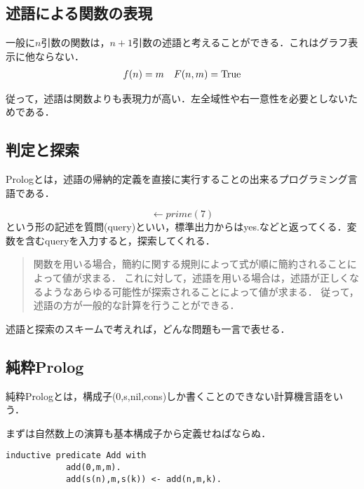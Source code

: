 \documentclass[uplatex, 12pt, dvipdfmx]{jsreport}
\begin{document}
\subsection{述語による関数の表現}

一般に$n$引数の関数は，$n+1$引数の述語と考えることができる．これはグラフ表示に他ならない．
\begin{align*}
    f(n) &= m & F(n,m)=\mathrm{True}
\end{align*}

従って，述語は関数よりも表現力が高い．左全域性や右一意性を必要としないためである．

\subsection{判定と探索}

Prologとは，述語の帰納的定義を直接に実行することの出来るプログラミング言語である．
\begin{definition}[query]
    \[\leftarrow prime(7)\]
    という形の記述を質問(query)といい，標準出力からはyes.などと返ってくる．変数を含むqueryを入力すると，探索してくれる．
\end{definition}

\begin{quotation}
    関数を用いる場合，簡約に関する規則によって式が順に簡約されることによって値が求まる．
    これに対して，述語を用いる場合は，述語が正しくなるようなあらゆる可能性が探索されることによって値が求まる．
    従って，述語の方が一般的な計算を行うことができる\cite{関数プログラミング}．
\end{quotation}

述語と探索のスキームで考えれば，どんな問題も一言で表せる．

\subsection{純粋Prolog}

純粋Prologとは，構成子(0,s,nil,cons)しか書くことのできない計算機言語をいう．

\begin{example}[Add]まずは自然数上の演算も基本構成子から定義せねばならぬ．
    \begin{lstlisting}[caption=natural number summation]
        inductive predicate Add with
            add(0,m,m).
            add(s(n),m,s(k)) <- add(n,m,k).
    \end{lstlisting}
\end{example}
\end{document}
